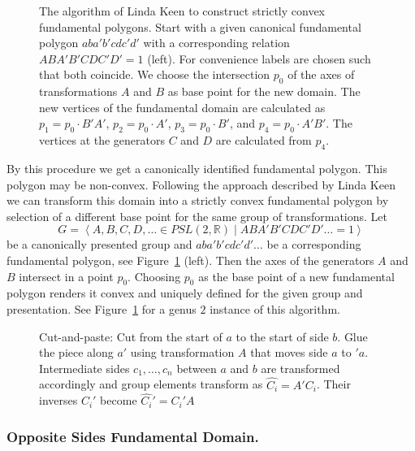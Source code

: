 \documentclass[Thesis]{subfiles}
\begin{document}
\begin{figure}
\centering
{}
\caption{
The algorithm of Linda Keen to construct strictly convex fundamental polygons. 
Start with a given canonical fundamental polygon $aba'b'cdc'd'$ with a corresponding relation $ABA'B'CDC'D'=1$ (left). 
For convenience labels are chosen such that both coincide. 
We choose the intersection $p_0$ of the axes of transformations $A$ and $B$ as base point for the new domain. 
The new vertices of the fundamental domain are calculated as $p_1=p_0\cdot B'A'$, $p_2=p_0\cdot A'$, $p_3=p_0\cdot B'$, and $p_4=p_0\cdot A'B'$. 
The vertices at the generators $C$ and $D$ are calculated from $p_4$.
}
\label{fig:keen_polygon}
\end{figure}

By this procedure we get a canonically identified fundamental polygon. 
This polygon may be non-convex. Following the approach described by Linda Keen~\cite{keen1966} we can transform this domain into a strictly convex fundamental polygon by selection of a different base point for the same group of transformations. Let
\begin{equation}
G=\left<A,B,C,D,\ldots\in \mathit{PSL}(2,\mathbb R)\mid ABA'B'CDC'D'\ldots=1\right>
\end{equation}
be a canonically presented group and $aba'b'cdc'd'\ldots$ be a corresponding fundamental polygon, see Figure~\ref{fig:keen_polygon} (left). 
Then the axes of the generators $A$ and $B$ intersect in a point $p_0$. 
Choosing $p_0$ as the base point of a new fundamental polygon renders it convex and uniquely defined for the given group and presentation. 
See Figure~\ref{fig:keen_polygon} for a genus $2$ instance of this algorithm.

\begin{figure}
\centering
\resizebox{0.4\textwidth}{!} {

}
\caption{Cut-and-paste: Cut from the start of $a$ to the start of side $b$. Glue the piece along $a'$ using transformation $A$ that moves side $a$ to $'a$. Intermediate sides $c_1,\ldots,c_n$ between $a$ and $b$ are transformed accordingly and group elements transform as $\hat{C_i}=A'C_i$. Their inverses $C_i'$ become $\hat{C_i}'=C_i'A$}
\label{fig:cut-and-paste-canonical}
\end{figure}

\subsubsection*{Opposite Sides Fundamental Domain.}
\end{document}
